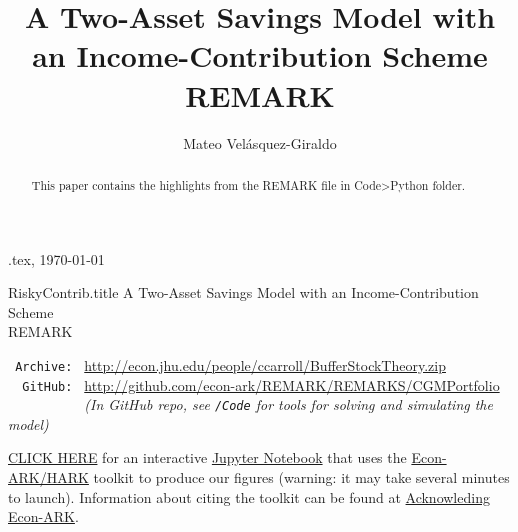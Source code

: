 \documentclass[./RiskyContrib.tex]{subfiles}
\begin{document}
\hfill{\tiny \texname.tex, \today}

\begin{verbatimwrite}{RiskyContrib.title}  %
A Two-Asset Savings Model with an Income-Contribution Scheme\\
REMARK
\end{verbatimwrite}

\title{A Two-Asset Savings Model with an Income-Contribution Scheme\\
REMARK}

\author{Mateo Vel\'asquez-Giraldo}


\maketitle 

\hypertarget{abstract}{}
\begin{abstract}
This paper contains the highlights from the REMARK file in Code>Python folder.
\end{abstract}

\hypertarget{links}{}
\begin{small}
\parbox{\textwidth}{
\begin{center}
\begin{tabbing}
\texttt{~Archive:~} \= \= \url{http://econ.jhu.edu/people/ccarroll/BufferStockTheory.zip} \kill \\  %
\texttt{~~GitHub:~} \> \> 
\url{http://github.com/econ-ark/REMARK/REMARKS/CGMPortfolio} \\
\texttt{~~~~~~~~~~} \> \> \textit{(In GitHub repo, see \texttt{/Code} for tools for solving and simulating the model)} \\
\end{tabbing}
\end{center}
          
\href{https://mybinder.org/v2/gh/matthew-zahn/CGMPort/develop?filepath=REMARK\%2FCGM_REMARK.ipynb}{CLICK HERE} for an interactive \href{https://en.wikipedia.org/wiki/Project\_Jupyter\#Jupyter_Notebook}{Jupyter Notebook} that uses the \href{https://econ-ark/HARK}{Econ-ARK/HARK} toolkit to produce our figures (warning: it may take several minutes to launch).  Information about citing the toolkit can be found at \href{https://econ-ark.org/acknowledging/}{Acknowleding Econ-ARK}.
} %
\end{small}
\end{document}

